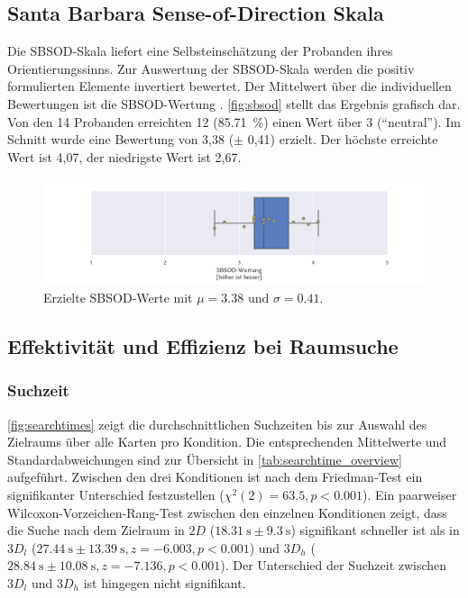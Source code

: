 \subsection{Santa Barbara Sense-of-Direction Skala}
Die SBSOD-Skala liefert eine Selbsteinschätzung der Probanden ihres Orientierungssinns.
Zur Auswertung der SBSOD-Skala werden die positiv formulierten Elemente invertiert bewertet.
Der Mittelwert über die individuellen Bewertungen ist die SBSOD-Wertung \parencite{Hegarty2002}.
\autoref{fig:sbsod} stellt das Ergebnis grafisch dar.
Von den 14 Probanden erreichten 12 (\SI{85,71}{\percent}) einen Wert über 3 (\enquote{neutral}).
Im Schnitt wurde eine Bewertung von 3,38 ($\pm$ 0,41) erzielt.
Der höchste erreichte Wert ist 4,07, der niedrigste Wert ist 2,67.
\begin{figure}[h!]
    \centering
    \includegraphics[trim={3cm, 0, 2.5cm, 0}, clip, width=0.9\linewidth]{figures/analysis/sbsod}
    \caption{Erzielte SBSOD-Werte mit $\mu = \num{3,38}$ und $\sigma = \num{0,41}$.}
    \label{fig:sbsod}
\end{figure}

\subsection{Effektivität und Effizienz bei Raumsuche}
\subsubsection*{Suchzeit}
\label{ssec:searchtime}

\autoref{fig:searchtimes} zeigt die durchschnittlichen Suchzeiten bis zur Auswahl des Zielraums über alle Karten pro Kondition.
Die entsprechenden Mittelwerte und Standardabweichungen sind zur Übersicht in \autoref{tab:searchtime_overview} aufgeführt.
Zwischen den drei Konditionen ist nach dem Friedman-Test ein signifikanter Unterschied festzustellen ($\chi^2(2) = \num{63.5}, p < 0.001$).
Ein paarweiser Wilcoxon-Vorzeichen-Rang-Test zwischen den einzelnen Konditionen zeigt, dass die Suche nach dem Zielraum in $2D$ ($\SI{18.31}{\second} \pm \SI{9.3}{\second}$) signifikant schneller ist als in $3D_l$ ($\SI{27.44}{\second} \pm \SI{13.39}{\second}, z=\num{-6.003}, p<\num{0.001}$) und $3D_h$ ($\SI{28.84}{\second} \pm \SI{10.08}{\second}, z=\num{-7.136}, p<0.001$).
Der Unterschied der Suchzeit zwischen $3D_l$ und $3D_h$ ist hingegen nicht signifikant.

